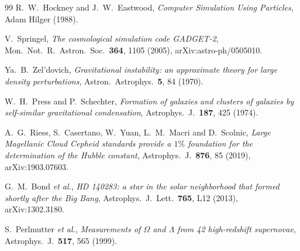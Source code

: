 \documentclass[11pt,a4paper]{article}
\theoremstyle{definition}
\begin{document}
{\begin{thebibliography}{99}
R.~W.~Hockney and J.~W.~Eastwood,
\emph{Computer Simulation Using Particles},
Adam Hilger (1988).

V.~Springel,
\emph{The cosmological simulation code GADGET-2},
Mon.\ Not.\ R.\ Astron.\ Soc.\ \textbf{364}, 1105 (2005), arXiv:astro-ph/0505010.

Ya.~B.~Zel'dovich,
\emph{Gravitational instability: an approximate theory for large density
perturbations},
Astron.\ Astrophys.\ \textbf{5}, 84 (1970).

W.~H.~Press and P.~Schechter,
\emph{Formation of galaxies and clusters of galaxies by self-similar
gravitational condensation},
Astrophys.\ J.\ \textbf{187}, 425 (1974).

A.~G.~Riess, S.~Casertano, W.~Yuan, L.~M.~Macri and D.~Scolnic,
\emph{Large Magellanic Cloud Cepheid standards provide a $1\%$ foundation for
the determination of the Hubble constant},
Astrophys.\ J.\ \textbf{876}, 85 (2019), arXiv:1903.07603.

G.~M.~Bond \emph{et al.},
\emph{HD 140283: a star in the solar neighborhood that formed shortly after
the Big Bang},
Astrophys.\ J.\ Lett.\ \textbf{765}, L12 (2013), arXiv:1302.3180.

S.~Perlmutter \emph{et al.},
\emph{Measurements of $\Omega$ and $\Lambda$ from 42 high-redshift
supernovae},
Astrophys.\ J.\ \textbf{517}, 565 (1999).

\end{thebibliography}
}
\end{document}

